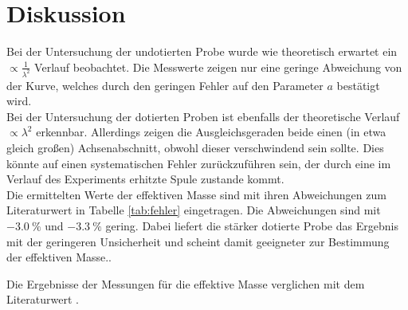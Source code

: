 
\section{Diskussion}
\label{sec:Diskussion}
Bei der Untersuchung der undotierten Probe wurde wie theoretisch erwartet ein $\propto\frac{1}{\lambda^2}$ Verlauf beobachtet. Die Messwerte zeigen nur eine geringe Abweichung von der Kurve, welches durch den geringen Fehler auf den Parameter $a$  bestätigt wird.\\
Bei der Untersuchung der dotierten Proben ist ebenfalls der theoretische Verlauf $\propto\lambda^2$ erkennbar. Allerdings zeigen die Ausgleichsgeraden beide einen (in etwa gleich großen) Achsenabschnitt, obwohl dieser verschwindend sein sollte. Dies könnte auf einen systematischen Fehler zurückzuführen sein, der durch eine im Verlauf des Experiments erhitzte Spule zustande kommt.\\
Die ermittelten Werte der effektiven Masse sind mit ihren Abweichungen zum Literaturwert in Tabelle \ref{tab:fehler} eingetragen. Die Abweichungen sind mit $\SI{-3.0}{\%}$ und $\SI{-3.3}{\%}$ gering. Dabei liefert die stärker dotierte Probe das Ergebnis mit der geringeren Unsicherheit und scheint damit geeigneter zur Bestimmung der effektiven Masse..

\begin{table}
	\centering
	\caption{Die Ergebnisse der Messungen für die effektive Masse verglichen mit dem Literaturwert \cite{}.}
	
	\label{tab:fehler}
\end{table}